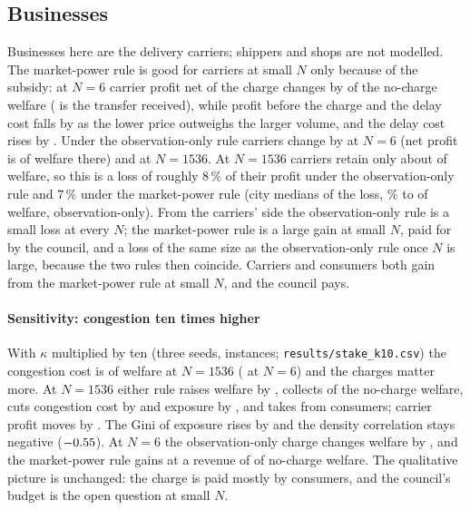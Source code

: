 \subsection{Businesses}\label{sec:businesses}
Businesses here are the delivery carriers; shippers and shops are not modelled. The market-power rule is good for carriers at small $N$ only because of the subsidy: at $N=6$ carrier profit net of the charge changes by \pc{\WSixPmdPi} of the no-charge welfare (\pc{\WSixPmR} is the transfer received), while profit before the charge and the delay cost falls by \pc{\WSixPmdPiop} as the lower price outweighs the larger volume, and the delay cost rises by \pc{\WSixPmdCC}. Under the observation-only rule carriers change by \pc{\WSixObsdPi} at $N=6$ (net profit is \pc{\LSixPiShare} of welfare there) and \pc{\WBigObsdPi} at $N=1536$. At $N=1536$ carriers retain only about \pc{\LBigPiShare} of welfare, so this is a loss of roughly $8\,\%$ of their profit under the observation-only rule and $7\,\%$ under the market-power rule (city medians of the loss, \WBigObsPiMin\% to \pc{\WBigObsPiMax} of welfare, observation-only). From the carriers' side the observation-only rule is a small loss at every $N$; the market-power rule is a large gain at small $N$, paid for by the council, and a loss of the same size as the observation-only rule once $N$ is large, because the two rules then coincide. Carriers and consumers both gain from the market-power rule at small $N$, and the council pays.

\paragraph{Sensitivity: congestion ten times higher} With $\kappa$ multiplied by ten (three seeds, \KtenRows{} instances; \texttt{results/stake\_k10.csv}) the congestion cost is \pc{\KtenCCBig} of welfare at $N=1536$ (\pc{\KtenCCSix} at $N=6$) and the charges matter more. At $N=1536$ either rule raises welfare by \pc{\KtenBigPmdSW}, collects \pc{\KtenBigPmR} of the no-charge welfare, cuts congestion cost by \pc{\KtenBigPmdCC} and exposure by \pc{\KtenBigPmdExp}, and takes \pc{\KtenBigPmdCS} from consumers; carrier profit moves by \pc{\KtenBigPmdPi}. The Gini of exposure rises by \KtenBigPmdGini{} and the density correlation stays negative ($-0.55$). At $N=6$ the observation-only charge changes welfare by \pc{\KtenSixObsdSW}, and the market-power rule gains \pc{\KtenSixPmdSW} at a revenue of \pc{\KtenSixPmR} of no-charge welfare. The qualitative picture is unchanged: the charge is paid mostly by consumers, and the council's budget is the open question at small $N$.


